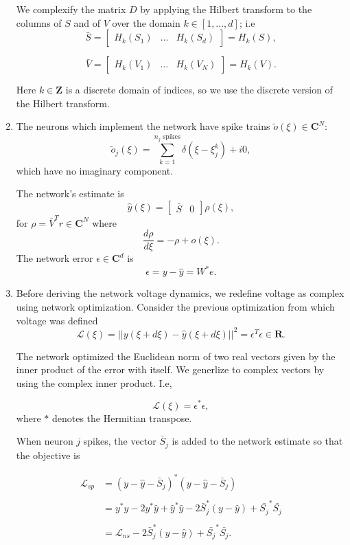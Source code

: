 \begin{enumerate}
We complexify the matrix $D$ by applying the Hilbert transform to the columns of $S$ and of $V$ over the domain $k \in \left[ 1,\hdots,d\right]$;  i.e
$$
\bar{S} = 
\begin{bmatrix}
H_k(S_1) & \hdots & H_k(S_d)
\end{bmatrix}  
= H_k(S),
$$

$$
\bar{V} = 
\begin{bmatrix}
H_k(V_1) & \hdots & H_k(V_N)
\end{bmatrix}  
= H_k(V).
$$

Here $k \in \mathbf{Z}$ is a discrete domain of indices, so we use the discrete version of the Hilbert transform.


\item The neurons which implement the network have spike trains $\tilde{o}(\xi) \in \mathbf{C}^{N}$:
    \begin{equation*}
        \tilde{o}_j(\xi) = \sum_{k=1}^{\text{$n_j$ spikes}} \delta(\xi - \xi_{j}^{k}) + i0,
    \end{equation*}
	which have no imaginary component. 
	
    The network's estimate is
	$$
      \hat{y}(\xi) = \begin{bmatrix}
      \bar{S} & 0
      \end{bmatrix} \rho(\xi), 
	$$
    for $\rho = \bar{V}^T r \in \mathbf{C}^N$ where
	$$
        \frac{d\rho}{d \xi} = -\rho + o(\xi).
    $$
	The network error $\epsilon \in \mathbf{C}^d$ is 
	$$
		\epsilon = y - \hat{y}  = W^* e.
	$$


\item Before deriving the network voltage dynamics, we redefine voltage as complex using network optimization. Consider the previous optimization from which voltage was defined
$$
\mathcal{L}(\xi) = || y(\xi + d\xi) - \hat{y}(\xi + d\xi)||^2 = \epsilon^T \epsilon \in \mathbf{R}.$$

The network optimized the Euclidean norm of two real vectors given by the inner product of the error with itself. We generlize to complex vectors by using the complex inner product. I.e, 

$$
\mathcal{L}(\xi) = \epsilon^*\epsilon, 
$$
where $*$ denotes the Hermitian transpose.

When neuron $j$ spikes, the vector $\bar{S}_j$ is added to the network estimate so that the objective is

\begin{align*}
\mathcal{L}_{sp}
&=
(y - \hat{y} - \bar{S}_j)^*(y - \hat{y} - \bar{S}_j)
\\
\\
&=
y^*y - 2 y^*\hat{y} + \hat{y}^*\hat{y} - 2 \bar{S}_j^*(y - \hat{y}) + \bar{S_j}^*\bar{S_j} 
\\
\\
&=
\mathcal{L}_{ns} - 2 \bar{S}_j^*(y - \hat{y}) + \bar{S_j}^*\bar{S_j}.
\end{align*}


\end{enumerate}
